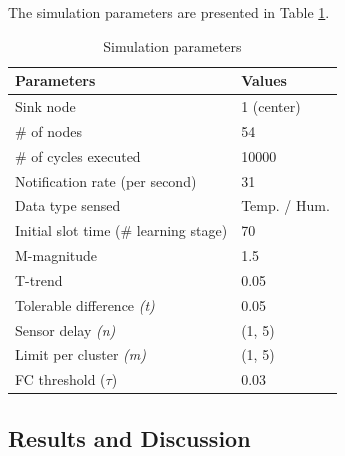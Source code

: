 \documentclass[conference]{IEEEtran}
\begin{document}
The simulation parameters are presented in Table \ref{tab:parameters}.

\begin{table}[h!]
\caption{Simulation parameters}
\label{tab:parameters}
\begin{center}
\begin{tabular}{|l||l|}
\hline
Parameters &Values\\
\hline\hline
Sink node &1 (center) \\
\hline
\# of nodes &54 \\
\hline
\# of cycles executed &10000 \\
\hline
Notification rate (per second) &31 \\
\hline
Data type sensed &Temp. / Hum. \\
\hline
Initial slot time (\# learning stage) &70 \\
\hline
M-magnitude &1.5 \\
\hline
T-trend &0.05 \\
\hline
Tolerable difference {\it(t)} &0.05 \\
\hline
Sensor delay {\it(n)} &(1, 5) \\
\hline
Limit per cluster {\it(m)} &(1, 5) \\
\hline
FC threshold ($\tau$) &0.03 \\
\hline
\end{tabular}
\end{center}
\end{table}


\subsection{Results and Discussion}
\label{results-and-discussion}


\end{document}
